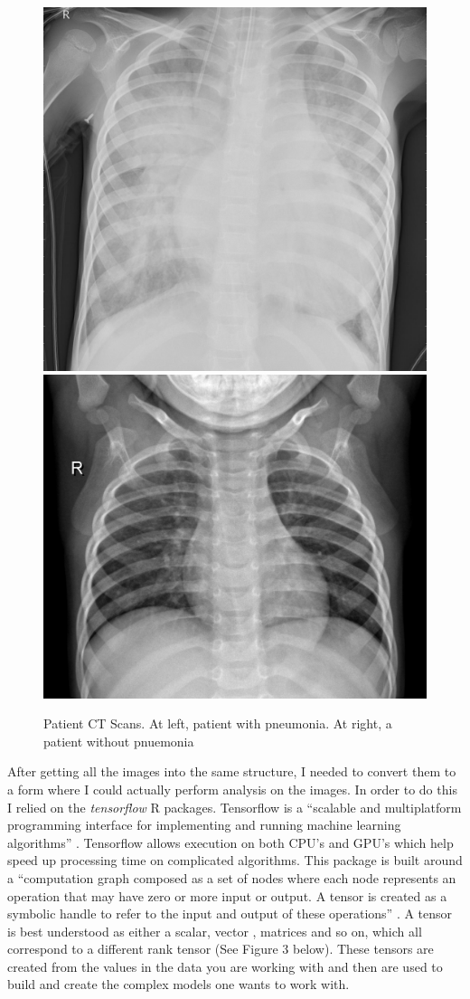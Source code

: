 \documentclass[12pt]{article}
\begin{document}
\begin{figure}
\includegraphics[width=0.49\linewidth,height=0.25\textheight]{images/pneumonia} \includegraphics[width=0.49\linewidth,height=0.25\textheight]{images/normal} \caption{Patient CT Scans. At left, patient with pneumonia. At right, a patient without pnuemonia}\label{fig:graunt}
\end{figure}

After getting all the images into the same structure, I needed to
convert them to a form where I could actually perform analysis on the
images. In order to do this I relied on the \emph{tensorflow} R
packages. Tensorflow is a ``scalable and multiplatform programming
interface for implementing and running machine learning algorithms''
\citet{PML}. Tensorflow allows execution on both CPU's and GPU's which
help speed up processing time on complicated algorithms. This package is
built around a ``computation graph composed as a set of nodes where each
node represents an operation that may have zero or more input or output.
A tensor is created as a symbolic handle to refer to the input and
output of these operations'' \citet{PML}. A tensor is best understood as
either a scalar, vector , matrices and so on, which all correspond to a
different rank tensor (See Figure 3 below). These tensors are created
from the values in the data you are working with and then are used to
build and create the complex models one wants to work with.
\end{document}
